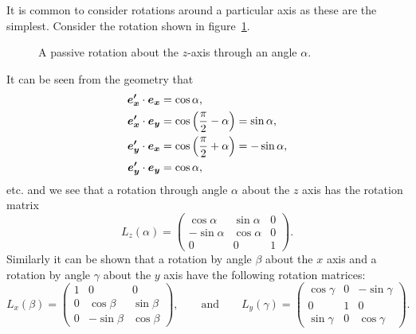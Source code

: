 It is common to consider rotations around a particular axis as these are the simplest.
Consider the rotation shown in figure~\ref{fig:rotation about z axis}.
\begin{figure}[ht]
    \centering
    \caption{A passive rotation about the \(z\)-axis through an angle \(\alpha\).}
    \label{fig:rotation about z axis}
\end{figure}
It can be seen from the geometry that
\begin{align*}
    \bm{e'_x}\cdot\bm{e_{x}} &= \cos\alpha,\\
    \bm{e'_x}\cdot\bm{e_{y}} &= \cos\left(\frac{\pi}{2} - \alpha\right) = \sin\alpha,\\
    \bm{e'_y}\cdot\bm{e_{x}} &= \cos\left(\frac{\pi}{2} + \alpha\right) = -\sin\alpha,\\
    \bm{e'_y}\cdot\bm{e_{y}} &= \cos\alpha,
\end{align*}
etc. and we see that a rotation through angle \(\alpha\) about the \(z\) axis has the rotation matrix
\[
L_z(\alpha) =
\begin{pmatrix}
    \cos\alpha & \sin\alpha & 0\\
    -\sin\alpha & \cos\alpha & 0\\
    0 & 0 & 1
\end{pmatrix}
.
\]
Similarly it can be shown that a rotation by angle \(\beta\) about the \(x\) axis and a rotation by angle \(\gamma\) about the \(y\) axis have the following rotation matrices:
\[
L_x(\beta) = 
\begin{pmatrix}
    1 & 0 & 0\\
    0 & \cos\beta & \sin\beta\\
    0 & -\sin\beta & \cos\beta
\end{pmatrix}
,\qquad\text{and}\qquad L_y(\gamma) =
\begin{pmatrix}
    \cos\gamma & 0 & -\sin\gamma\\
    0 & 1 & 0\\
    \sin\gamma & 0 & \cos\gamma
\end{pmatrix}
.
\]
